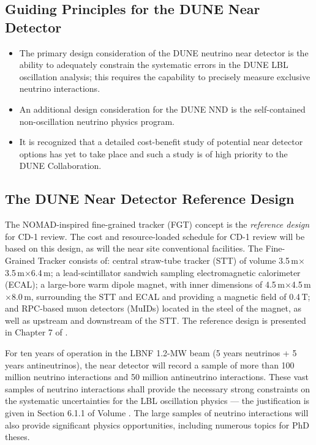 \subsection{Guiding Principles for the DUNE Near Detector}

\begin{itemize}
\item  The primary design consideration of the DUNE neutrino near detector is the 
ability to adequately constrain the systematic errors in the DUNE LBL oscillation 
analysis; this requires the capability to precisely measure exclusive neutrino
interactions.

\item An additional design consideration for the DUNE NND is the self-contained non-oscillation 
neutrino physics program.

\item It is recognized that a detailed cost-benefit study of potential near detector options 
has yet to take place and such a study is of high priority to the DUNE Collaboration.
\end{itemize}

\subsection{The DUNE Near Detector Reference Design }

The NOMAD-inspired fine-grained tracker (FGT) concept is the \textit{reference 
design} for CD-1 review. The cost and resource-loaded schedule for CD-1 review 
will be based on this design, as will the near site conventional facilities. The 
Fine-Grained Tracker consists of:  central straw-tube tracker (STT) of volume 
3.5\,m$\times$3.5\,m$\times$6.4\,m; a lead-scintillator sandwich sampling electromagnetic calorimeter 
(ECAL); a large-bore warm dipole magnet, with inner dimensions of 
4.5\,m$\times$4.5\,m$\times$8.0\,m, surrounding the STT and ECAL and providing a magnetic field of 0.4\,T; 
and RPC-based muon detectors (MuIDs) located in the steel of the magnet, as well 
as upstream and downstream of the STT. The reference 
design is presented in Chapter 
7 of \voldune. 

For ten years of operation in the LBNF 1.2-MW beam (5 years neutrinos + 5 years 
antineutrinos), the near detector will record a sample of more than 100 million 
neutrino interactions and 50 million antineutrino interactions. These vast samples 
of neutrino interactions shall provide the necessary strong constraints on the 
systematic uncertainties for the LBL oscillation physics --- the justification is 
given in Section 6.1.1 of Volume \volphys. The large samples of neutrino 
interactions will also provide significant physics opportunities, including 
numerous topics for PhD theses.  

